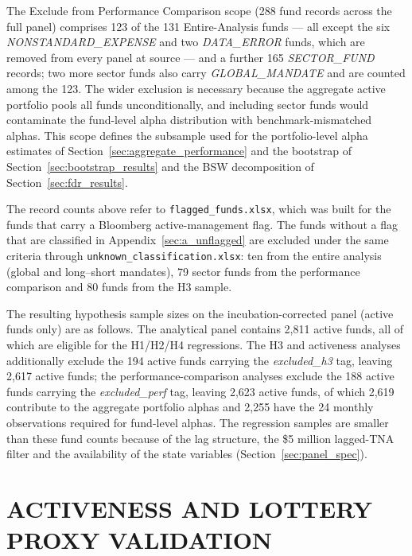 \documentclass[12pt, oneside]{report}
\newcommand{\flag}[1]{\textit{#1}}
\begin{document}
The Exclude from Performance Comparison scope (288 fund
records across the full panel) comprises 123 of the 131 Entire-Analysis
funds --- all except the six \flag{NONSTANDARD\_EXPENSE} and two
\flag{DATA\_ERROR} funds, which are removed from every panel at source
--- and a further 165 \flag{SECTOR\_FUND} records; two more sector
funds also carry \flag{GLOBAL\_MANDATE} and are counted among the
123. The wider exclusion is
necessary because the aggregate active portfolio pools all funds
unconditionally, and including sector funds would contaminate the
fund-level alpha distribution with benchmark-mismatched alphas.
This scope defines the subsample used for the portfolio-level
alpha estimates of Section~\ref{sec:aggregate_performance} and the
bootstrap of Section~\ref{sec:bootstrap_results} and the BSW
decomposition of Section~\ref{sec:fdr_results}.

The record counts above refer to \texttt{flagged\_funds.xlsx}, which was
built for the funds that carry a Bloomberg active-management flag. The
funds without a flag that are classified in
Appendix~\ref{sec:a_unflagged} are excluded under the same criteria
through \texttt{unknown\_classification.xlsx}: ten from the entire
analysis (global and long--short mandates), 79 sector funds from the
performance comparison and 80 funds from the H3 sample.

The resulting hypothesis sample sizes on the incubation-corrected
panel (active funds only) are as follows. The analytical panel contains
2{,}811 active funds, all of which are eligible for the H1/H2/H4
regressions. The H3 and activeness analyses additionally exclude the 194
active funds carrying the \flag{excluded\_h3} tag, leaving 2{,}617 active
funds; the performance-comparison analyses exclude the 188 active funds
carrying the \flag{excluded\_perf} tag, leaving 2{,}623 active funds, of
which 2{,}619 contribute to the aggregate portfolio alphas and 2{,}255
have the 24 monthly observations required for fund-level alphas. The
regression samples are smaller than these fund counts because of the
lag structure, the \$5 million lagged-TNA filter and the availability of
the state variables (Section~\ref{sec:panel_spec}).

\chapter{ACTIVENESS AND LOTTERY PROXY VALIDATION}
\label{app:proxy_validation}
\end{document}
